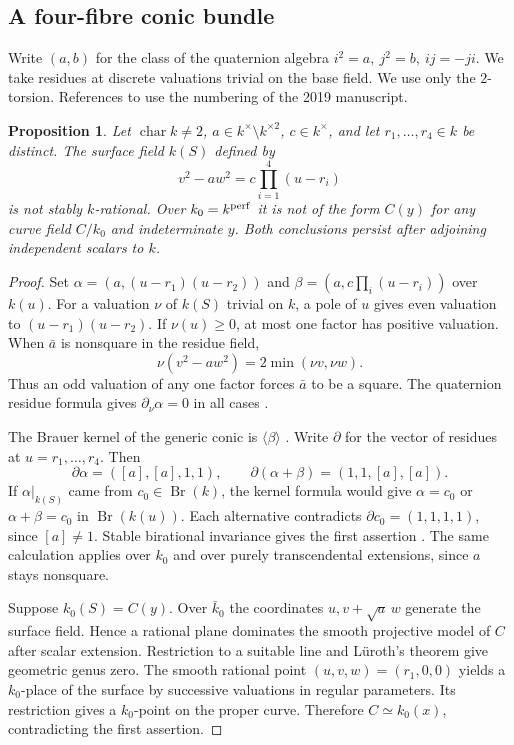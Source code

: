 \documentclass[11pt,a4paper]{article}
\newtheorem{proposition}[theorem]{Proposition}
\theoremstyle{definition}
\begin{document}
\subsection{A four-fibre conic bundle}
Write \((a,b)\) for the class of the quaternion algebra \(i^2=a,\ j^2=b,\ ij=-ji\). We take residues at discrete valuations trivial on the base field. We use only the \(2\)-torsion. References to \cite{CTS} use the numbering of the 2019 manuscript.
\begin{proposition}\label{prop:fourbranch}
Let \(\operatorname{char}k\ne2\), \(a\in k^\times\setminus k^{\times2}\), \(c\in k^\times\), and let \(r_1,\ldots,r_4\in k\) be distinct. The surface field \(k(S)\) defined by
\[
 v^2-aw^2=c\prod_{i=1}^4(u-r_i)
\]
is not stably \(k\)-rational. Over \(k_0=k^{\rm perf}\) it is not of the form \(C(y)\) for any curve field \(C/k_0\) and indeterminate \(y\). Both conclusions persist after adjoining independent scalars to \(k\).
\end{proposition}
\begin{proof}
Set \(\alpha=(a,(u-r_1)(u-r_2))\) and \(\beta=(a,c\prod_i(u-r_i))\) over \(k(u)\). For a valuation \(\nu\) of \(k(S)\) trivial on \(k\), a pole of \(u\) gives even valuation to \((u-r_1)(u-r_2)\). If \(\nu(u)\ge0\), at most one factor has positive valuation. When \(\bar a\) is nonsquare in the residue field,
\[
 \nu(v^2-aw^2)=2\min(\nu v,\nu w).
\]
Thus an odd valuation of any one factor forces \(\bar a\) to be a square. The quaternion residue formula gives \(\partial_\nu\alpha=0\) in all cases \cite[Ex.~5.2.10]{CTS}.

The Brauer kernel of the generic conic is \(\langle\beta\rangle\) \cite[Prop.~6.2.1]{CTS}. Write \(\partial\) for the vector of residues at \(u=r_1,\ldots,r_4\). Then
\[
 \partial\alpha=([a],[a],1,1),\qquad
 \partial(\alpha+\beta)=(1,1,[a],[a]).
\]
If \(\alpha|_{k(S)}\) came from \(c_0\in\operatorname{Br}(k)\), the kernel formula would give \(\alpha=c_0\) or \(\alpha+\beta=c_0\) in \(\operatorname{Br}(k(u))\). Each alternative contradicts \(\partial c_0=(1,1,1,1)\), since \([a]\ne1\). Stable birational invariance gives the first assertion \cite[Cor.~5.2.5]{CTS}. The same calculation applies over \(k_0\) and over purely transcendental extensions, since \(a\) stays nonsquare.

Suppose \(k_0(S)=C(y)\). Over \(\bar k_0\) the coordinates \(u,v+\sqrt a\,w\) generate the surface field. Hence a rational plane dominates the smooth projective model of \(C\) after scalar extension. Restriction to a suitable line and Lüroth's theorem give geometric genus zero. The smooth rational point \((u,v,w)=(r_1,0,0)\) yields a \(k_0\)-place of the surface by successive valuations in regular parameters. Its restriction gives a \(k_0\)-point on the proper curve. Therefore \(C\simeq k_0(x)\), contradicting the first assertion.
\end{proof}
\end{document}
